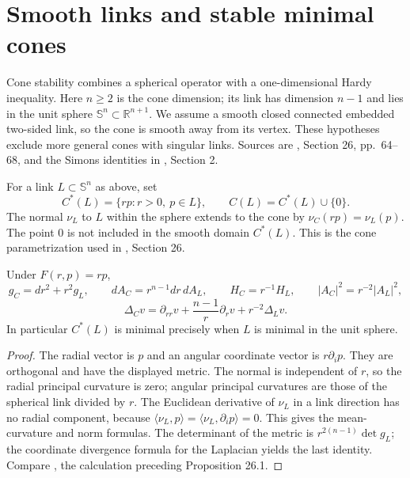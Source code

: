 \chapter{Smooth links and stable minimal cones}\label{sec:stable-cones}
Cone stability combines a spherical operator with a one-dimensional Hardy inequality. Here $n\geq2$ is the cone dimension; its link has dimension $n-1$ and lies in the unit sphere $\mathbb S^n\subset\mathbb R^{n+1}$. We assume a smooth closed connected embedded two-sided link, so the cone is smooth away from its vertex. These hypotheses exclude more general cones with singular links. Sources are \cite{ChMin}, Section 26, pp.~64--68, and the Simons identities in \cite{HP99}, Section 2.

\begin{definition}\label{def:smooth-link-cone}
For a link $L\subset\mathbb S^n$ as above, set
\[
 C^*(L)=\{rp:r>0,\ p\in L\},\qquad C(L)=C^*(L)\cup\{0\}.
\]
The normal $\nu_L$ to $L$ within the sphere extends to the cone by $\nu_C(rp)=\nu_L(p)$. The point $0$ is not included in the smooth domain $C^*(L)$. This is the cone parametrization used in \cite{ChMin}, Section 26.
\end{definition}

\begin{proposition}\label{prop:cone-geometry}
Under $F(r,p)=rp$,
\[
 g_C=dr^2+r^2g_L,\qquad dA_C=r^{n-1}dr\,dA_L,
 \qquad H_C=r^{-1}H_L,\qquad |A_C|^2=r^{-2}|A_L|^2,
\]
\[
 \Delta_C v=\partial_{rr}v+\frac{n-1}{r}\partial_rv+r^{-2}\Delta_Lv.
\]
In particular $C^*(L)$ is minimal precisely when $L$ is minimal in the unit sphere.
\end{proposition}
\begin{proof}
The radial vector is $p$ and an angular coordinate vector is $r\partial_ip$. They are orthogonal and have the displayed metric. The normal is independent of $r$, so the radial principal curvature is zero; angular principal curvatures are those of the spherical link divided by $r$. The Euclidean derivative of $\nu_L$ in a link direction has no radial component, because $\langle\nu_L,p\rangle=\langle\nu_L,\partial_ip\rangle=0$. This gives the mean-curvature and norm formulas. The determinant of the metric is $r^{2(n-1)}\det g_L$; the coordinate divergence formula for the Laplacian yields the last identity. Compare \cite{ChMin}, the calculation preceding Proposition 26.1.
\end{proof}

